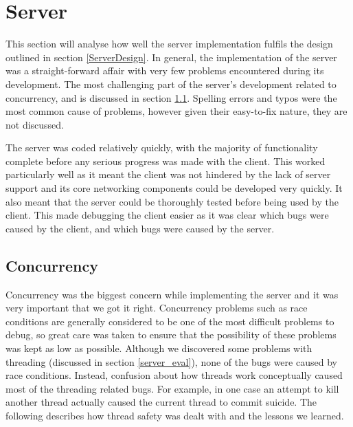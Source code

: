 \section{Server}

This section will analyse how well the server implementation fulfils the design outlined in section \ref{ServerDesign}. In general, the implementation of the server was a straight-forward affair with very few problems encountered during its development. The most challenging part of the server's development related to concurrency, and is discussed in section \ref{concur}. Spelling errors and typos were the most common cause of problems, however given their easy-to-fix nature, they are not discussed.

The server was coded relatively quickly, with the majority of functionality complete before any serious progress was made with the client. This worked particularly well as it meant the client was not hindered by the lack of server support and its core networking components could be developed very quickly. It also meant that the server could be thoroughly tested before being used by the client. This made debugging the client easier as it was clear which bugs were caused by the client, and which bugs were caused by the server.

\subsection{Concurrency}
\label{concur}
Concurrency was the biggest concern while implementing the server and it was very important that we got it right. Concurrency problems such as race conditions are generally considered to be one of the most difficult problems to debug, so great care was taken to ensure that the possibility of these problems was kept as low as possible. Although we discovered some problems with threading (discussed in section \ref{server_eval}), none of the bugs were caused by race conditions. Instead, confusion about how threads work conceptually caused most of the threading related bugs. For example, in one case an attempt to kill another thread actually caused the current thread to commit suicide. The following describes how thread safety was dealt with and the lessons we learned.

